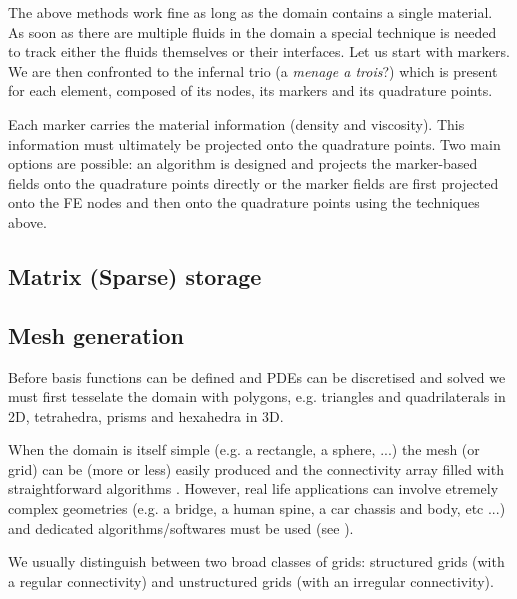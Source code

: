 \documentclass[a4paper]{article}
\begin{document}
The above methods work fine as long as the domain contains a single material. As soon as there are multiple fluids in the domain a special technique is needed to track either the fluids themselves or their interfaces. 
Let us start with markers. We are then confronted to the infernal trio (a {\it menage a trois}?)
which is present for each element, composed of its nodes, its markers and its quadrature points. 

Each marker carries the material information (density and viscosity). 
This information must ultimately be projected onto the quadrature points. Two main options are possible: an algorithm is designed and projects the marker-based fields onto the quadrature points directly or the marker fields are first projected onto the FE nodes and then onto the quadrature points using the techniques above.  
 
\newpage
\subsection{Matrix (Sparse) storage}












\newpage
\subsection{Mesh generation}
\label{subsection_meshes}

Before basis functions can be defined and PDEs can be discretised and solved 
we must first tesselate the domain with polygons, e.g. triangles and 
quadrilaterals in 2D, tetrahedra, prisms and hexahedra in 3D.  

When the domain is itself simple (e.g. a rectangle, a sphere, ...) the mesh (or grid) can 
be (more or less) easily produced and the connectivity array filled with straightforward 
algorithms \cite{thie18}.
However, real life applications can involve etremely complex geometries (e.g. a bridge, 
a human spine, a car chassis and body, etc ...) and dedicated algorithms/softwares 
must be used (see \cite{thsw,frge,xiyz09}). 

We usually distinguish between two broad classes of grids: structured grids (with a regular 
connectivity) and unstructured grids (with an irregular connectivity).
 
\end{document}
